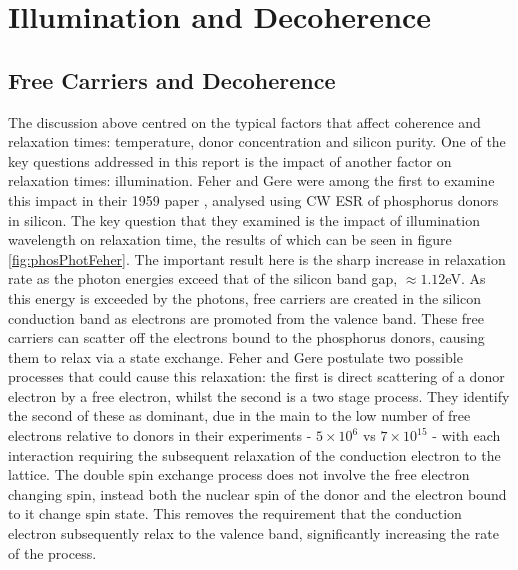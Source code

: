 \section{Illumination and Decoherence}

\subsection{Free Carriers and Decoherence}

The discussion above centred on the typical factors that affect coherence and relaxation times:  temperature, donor concentration and silicon purity.
One of the key questions addressed in this report is the impact of another factor on relaxation times: illumination.
Feher and Gere were among the first to examine this impact in their 1959 paper \cite{Gere1959}, analysed using CW ESR of phosphorus donors in silicon.
The key question that they examined is the impact of illumination wavelength on relaxation time, the results of which can be seen in figure \ref{fig:phosPhotFeher}.
The important result here is the sharp increase in relaxation rate as the photon energies exceed that of the silicon band gap, $\approx 1.12$eV.
As this energy is exceeded by the photons, free carriers are created in the silicon conduction band as electrons are promoted from the valence band.
These free carriers can scatter off the electrons bound to the phosphorus donors, causing them to relax via a state exchange.
Feher and Gere postulate two possible processes that could cause this relaxation: the first is direct scattering of a donor electron by a free electron, whilst the second is a two stage process.
They identify the second of these as dominant, due in the main to the low number of free electrons relative to donors in their experiments - $5\times10^6$ vs $7\times10^{15}$ - with each interaction requiring the subsequent relaxation of the conduction electron to the lattice.
The double spin exchange process does not involve the free electron changing spin, instead both the nuclear spin of the donor and the electron bound to it change spin state.
This removes the requirement that the conduction electron subsequently relax to the valence band, significantly increasing the rate of the process.
\\

